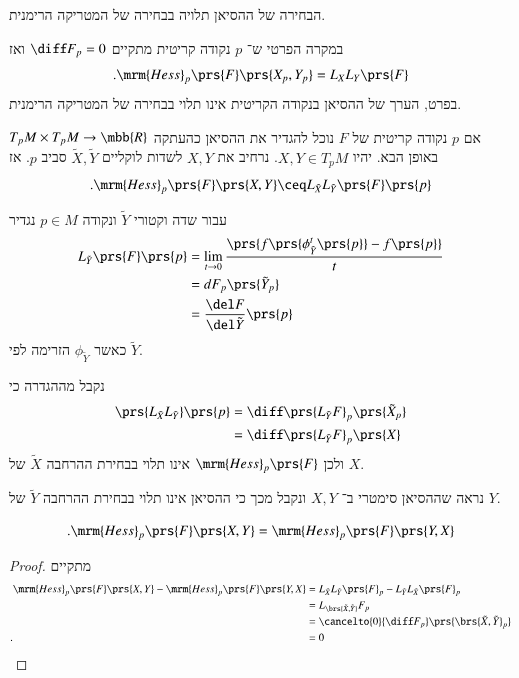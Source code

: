 \documentclass[a4paper,10pt,twoside,openany]{book}
\begin{document}
\begin{remark}
הבחירה של ההסיאן תלויה בבחירה של המטריקה הרימנית.

במקרה הפרטי ש־%
$p$
נקודה קריטית מתקיים
$\diff F_p = 0$
ואז
\[\text{.} \mrm{Hess}_p\prs{F}\prs{X_p, Y_p} = L_X L_Y\prs{F}\]
בפרט, הערך של ההסיאן בנקודה הקריטית אינו תלוי בבחירה של המטריקה הרימנית.
\end{remark}

\begin{remark}
אם
$p$
נקודה קריטית של
$F$
נוכל להגדיר את ההסיאן כהעתקה
$T_p M \times T_p M \to \mbb{R}$
באופן הבא.
יהיו
$X,Y \in T_p M$.
נרחיב את
$X,Y$
לשדות לוקליים
$\tilde{X}, \tilde{Y}$
סביב
$p$.
אז
\[\text{.} \mrm{Hess}_p\prs{F} \prs{X,Y} \ceq L_{\tilde{X}} L_{\tilde{Y}}\prs{F}\prs{p}\]
\end{remark}

\begin{definition}[נגזרת לי]
עבור שדה וקטורי
$\tilde{Y}$
ונקודה
$p \in M$
נגדיר
\begin{align*}
L_{\tilde{Y}}\prs{F}\prs{p} &= \lim_{t\to 0} \frac{\prs{f\prs{\phi_{\tilde{Y}}^t\prs{p}} - f\prs{p}}}{t} \\&=
d F_p\prs{\tilde{Y}_p}
\\ &=
\frac{\del F}{\del \tilde{Y}}\prs{p}
\end{align*}
כאשר
$\phi_{\tilde{Y}}$
הזרימה לפי
$\tilde{Y}$.
\end{definition}

\begin{remark}
נקבל מההגדרה כי
\begin{align*}
\prs{L_{\tilde{X}} L_{\tilde{Y}}}\prs{p}
&=
\diff \prs{L_{\tilde{Y}} F}_p \prs{\tilde{X}_p}
\\&=
\diff \prs{L_{\tilde{Y}} F}_p \prs{X}
\end{align*}
ולכן
$\mrm{Hess}_p \prs{F}$
אינו תלוי בבחירת ההרחבה
$\tilde{X}$
של
$X$.
\end{remark}

נראה שההסיאן סימטרי ב־%
$X,Y$
ונקבל מכך כי ההסיאן אינו תלוי בבחירת ההרחבה
$\tilde{Y}$
של
$Y$.

\begin{proposition}
\[\text{.} \mrm{Hess}_p\prs{F}\prs{X,Y} = \mrm{Hess}_p\prs{F}\prs{Y,X}\]
\end{proposition}

\begin{proof}
מתקיים
\begin{align*}
\mrm{Hess}_p\prs{F}\prs{X,Y} - \mrm{Hess}_p\prs{F}\prs{Y,X}
&=
L_{\tilde{X}} L_{\tilde{Y}}\prs{F}_p - L_{\tilde{Y}}L_{\tilde{X}}\prs{F}_p
\\&=
L_{\brs{\tilde{X}, \tilde{Y}}} F_p
\\&= \cancelto{0}{\diff F_p} \prs{\brs{\tilde{X}, \tilde{Y}}_p}
\\ \text{.} \hphantom{\mrm{Hess}_p\prs{F}\prs{X,Y} - \mrm{Hess}_p\prs{F}\prs{Y,X}} &= 0 
\end{align*}
\end{proof}
\end{document}
